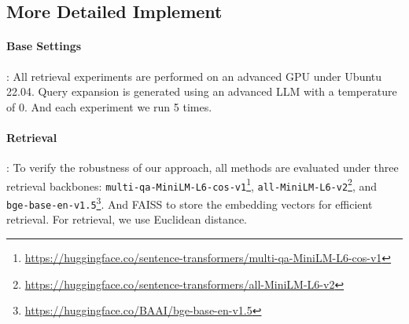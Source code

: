 \subsection*{More Detailed Implement}
\paragraph{Base Settings}:
All retrieval experiments are performed on an advanced GPU under Ubuntu 22.04.  Query expansion is generated using an advanced LLM with a temperature of 0. And each experiment we run 5 times.

\paragraph{Retrieval}: To verify the robustness of our approach, all methods are evaluated under three retrieval backbones: \texttt{multi-qa-MiniLM-L6-cos-v1}\footnote{\url{https://huggingface.co/sentence-transformers/multi-qa-MiniLM-L6-cos-v1}}, \texttt{all-MiniLM-L6-v2}\footnote{\url{https://huggingface.co/sentence-transformers/all-MiniLM-L6-v2}}, and \texttt{bge-base-en-v1.5}\footnote{\url{https://huggingface.co/BAAI/bge-base-en-v1.5}}. And FAISS to store the embedding vectors for efficient retrieval. For retrieval, we use Euclidean distance.


